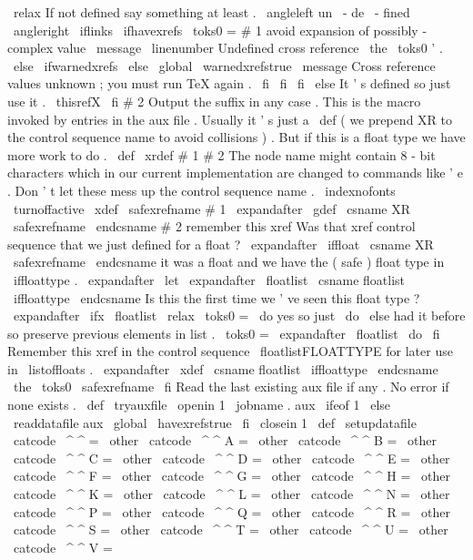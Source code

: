 {{{{{\
relax
%
If
not
defined
say
something
at
least
.
\
angleleft
un
\
-
de
\
-
fined
\
angleright
\
iflinks
\
ifhavexrefs
{
\
toks0
=
{
#
1
}
%
avoid
expansion
of
possibly
-
complex
value
\
message
{
\
linenumber
Undefined
cross
reference
\
the
\
toks0
'
.
}
}
%
\
else
\
ifwarnedxrefs
\
else
\
global
\
warnedxrefstrue
\
message
{
Cross
reference
values
unknown
;
you
must
run
TeX
again
.
}
%
\
fi
\
fi
\
fi
\
else
%
It
'
s
defined
so
just
use
it
.
\
thisrefX
\
fi
#
2
%
Output
the
suffix
in
any
case
.
}
%
This
is
the
macro
invoked
by
entries
in
the
aux
file
.
Usually
it
'
s
%
just
a
\
def
(
we
prepend
XR
to
the
control
sequence
name
to
avoid
%
collisions
)
.
But
if
this
is
a
float
type
we
have
more
work
to
do
.
%
\
def
\
xrdef
#
1
#
2
{
%
{
%
The
node
name
might
contain
8
-
bit
characters
which
in
our
current
%
implementation
are
changed
to
commands
like
'
e
.
Don
'
t
let
these
%
mess
up
the
control
sequence
name
.
\
indexnofonts
\
turnoffactive
\
xdef
\
safexrefname
{
#
1
}
%
}
%
%
\
expandafter
\
gdef
\
csname
XR
\
safexrefname
\
endcsname
{
#
2
}
%
remember
this
xref
%
%
Was
that
xref
control
sequence
that
we
just
defined
for
a
float
?
\
expandafter
\
iffloat
\
csname
XR
\
safexrefname
\
endcsname
%
it
was
a
float
and
we
have
the
(
safe
)
float
type
in
\
iffloattype
.
\
expandafter
\
let
\
expandafter
\
floatlist
\
csname
floatlist
\
iffloattype
\
endcsname
%
%
Is
this
the
first
time
we
'
ve
seen
this
float
type
?
\
expandafter
\
ifx
\
floatlist
\
relax
\
toks0
=
{
\
do
}
%
yes
so
just
\
do
\
else
%
had
it
before
so
preserve
previous
elements
in
list
.
\
toks0
=
\
expandafter
{
\
floatlist
\
do
}
%
\
fi
%
%
Remember
this
xref
in
the
control
sequence
\
floatlistFLOATTYPE
%
for
later
use
in
\
listoffloats
.
\
expandafter
\
xdef
\
csname
floatlist
\
iffloattype
\
endcsname
{
\
the
\
toks0
{
\
safexrefname
}
}
%
\
fi
}
%
Read
the
last
existing
aux
file
if
any
.
No
error
if
none
exists
.
%
\
def
\
tryauxfile
{
%
\
openin
1
\
jobname
.
aux
\
ifeof
1
\
else
\
readdatafile
{
aux
}
%
\
global
\
havexrefstrue
\
fi
\
closein
1
}
\
def
\
setupdatafile
{
%
\
catcode
\
^
^
=
\
other
\
catcode
\
^
^
A
=
\
other
\
catcode
\
^
^
B
=
\
other
\
catcode
\
^
^
C
=
\
other
\
catcode
\
^
^
D
=
\
other
\
catcode
\
^
^
E
=
\
other
\
catcode
\
^
^
F
=
\
other
\
catcode
\
^
^
G
=
\
other
\
catcode
\
^
^
H
=
\
other
\
catcode
\
^
^
K
=
\
other
\
catcode
\
^
^
L
=
\
other
\
catcode
\
^
^
N
=
\
other
\
catcode
\
^
^
P
=
\
other
\
catcode
\
^
^
Q
=
\
other
\
catcode
\
^
^
R
=
\
other
\
catcode
\
^
^
S
=
\
other
\
catcode
\
^
^
T
=
\
other
\
catcode
\
^
^
U
=
\
other
\
catcode
\
^
^
V
=
\
}}}}}
